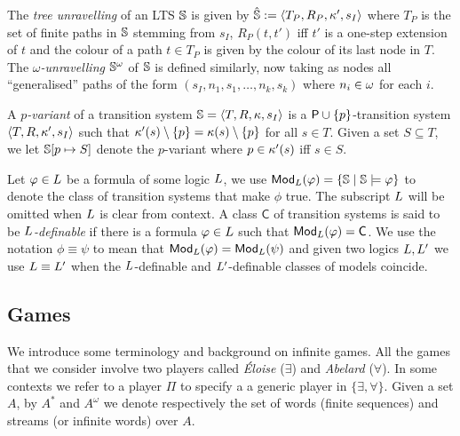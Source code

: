The \emph{tree unravelling} of an LTS $\mathbb{S}$ is given by $\hat{\mathbb{S}} 
\mathrel{:=} \langle{T_P,R_P,\kappa',s_I}\rangle$ where $T_P$ is the set of finite paths in 
$\mathbb{S}$ stemming from $s_I$, $R_P(t,t')$ iff $t'$ is a one-step extension of $t$ 
and the colour of a path $t\in T_P$ is given by the colour of its last node in
$T$.
The \emph{$\omega$-unravelling} ${\mathbb{S}}^\omega$ of $\mathbb{S}$ is defined 
similarly, now taking as nodes all ``generalised'' paths of the form 
$(s_{I},n_{1},s_{1},\ldots,n_{k},s_{k})$ where $n_{i} \in \omega$ for each $i$.

A \emph{$p$-variant} of a transition system $\mathbb{S} = \langle{T,R,\kappa,s_I}\rangle$
is a $\mathsf{P}\cup\{p\}$-transition system $\langle{T,R,\kappa',s_I}\rangle$
such that $\kappa'(s)\setminus\{p\} = \kappa(s) \setminus \{p \}$ for all 
$s \in T$.
Given a set $S \subseteq T$, we let $\mathbb{S}[p\mapsto S]$ denote the $p$-variant
where $p \in \kappa'(s)$ iff $s \in S$.

Let $\varphi \in L$ be a formula of some logic $L$,
we use $\mathsf{Mod}_{L}(\varphi) = \{\mathbb{S} \mid \mathbb{S} \models \varphi\}$ to denote 
the class of transition systems that make $\phi$ true.
The subscript $L$ will be omitted when $L$ is clear from context.
A class $\mathsf{C}$ of transition systems is said to be 
\emph{$L$-definable} if there is a formula $\varphi \in L$ such that
$\mathsf{Mod}_{L}(\varphi) = \mathsf{C}$.
We use the notation $\phi \equiv \psi$ to mean that $\mathsf{Mod}_{L}(\varphi) = 
\mathsf{Mod}_{L}(\psi)$ and given two logics $L, L'$ we use $L \equiv 
L'$ when the $L$-definable and $L'$-definable classes of 
models coincide.


\subsection{Games}

We introduce some terminology and background on infinite games.
All the games that we consider involve two players called \emph{\'Eloise}
($\exists$) and \emph{Abelard} ($\forall$).
In some contexts we refer to a player $\Pi$ to specify a
a generic player in $\{\exists,\forall\}$.
%
Given a set $A$, by $A^*$ and $A^\omega$ we denote respectively the set of
words (finite sequences) and streams (or infinite words) over $A$.

